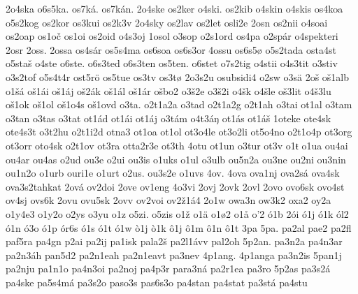 {    2o4ska
    o6s5ka.
    os7ká.
    os7kán.
    2o4ske
    os2ker
    o4ski.
    os2kib
    o4skin
    o4skis
    os4koa
    o5s2kog
    os2kor
    os3kui
    os2k3v
    2o4sky
    os2lav
    os2let
    osli2e
    2osn
    os2nii
    o4soai
    os2oap
    os1oč
    os1oi
    os2oid
    o4s3oj
    1osol
    o3sop
    o2s1ord
    os4pa
    o2spár
    o4spekteri
    2osr
    2oss.
    2ossa
    os4sár
    os5s4ma
    os6soa
    os6s3or
    4ossu
    os6s5ø
    o5s2tada
    osta4st
    o5staš
    o4ste
    o6ste.
    o6s3ted
    o6s3ten
    os5ten.
    o6stet
    o7s2tig
    o4stii
    o4s3tit
    o3stiv
    o3s2tof
    o5s4t4r
    ost5rö
    os5tue
    os3tv
    os3tø
    2o3s2u
    osubsidi4
    o2sw
    o3sä
    2oš
    oš1alb
    o1šá
    oš1ái
    oš1áj
    oš2ák
    oš1ál
    oš1ár
    ošbo2
    o3š2e
    o3š2i
    o4šk
    o4šle
    oš3lit
    o4š3lu
    oš1ok
    oš1ol
    oš1o4s
    oš1ovd
    o3ta.
    o2t1a2a
    o3tad
    o2t1a2g
    o2t1ah
    o3tai
    ot1al
    o3tam
    o3tan
    o3tas
    o3tat
    ot1ád
    ot1ái
    ot1áj
    o3tám
    o4t3áŋ
    ot1ás
    ot1áš
    1oteke
    ote4sk
    ote4s3t
    o3t2hu
    o2t1i2d
    otna3
    ot1oa
    ot1ol
    ot3o4le
    ot3o2li
    ot5o4no
    o2t1o4p
    ot3org
    ot3orr
    oto4sk
    o2t1ov
    ot3ra
    otta2r3e
    ot3th
    4otu
    ot1un
    o3tur
    ot3v
    o1ŧ
    o1ua
    ou4ai
    ou4ar
    ou4as
    o2ud
    ou3e
    o2ui
    ou3is
    o1uks
    o1ul
    o3ulb
    ou5n2a
    ou3ne
    ou2ni
    ou3nin
    ou1n2o
    o1urb
    ouri1e
    o1urt
    o2us.
    ou3s2e
    o1uvs
    4ov.
    4ova
    ova1nj
    ova2sá
    ova4sk
    ova3s2tahkat
    2ová
    ov2doi
    2ove
    ov1eng
    4o3vi
    2ovj
    2ovk
    2ovl
    2ovo
    ovo6sk
    ovo4st
    ov4sj
    ovs6k
    2ovu
    ovu5sk
    2ovv
    ov2voi
    ov2ž1á4
    2o1w
    owa3n
    ow3k2
    oxa2
    oy2a
    o1y4e3
    o1y2o
    o2ys
    o3yu
    o1z
    o5zi.
    o5zis
    o1ž
    o1ä
    o1ø2
    o1å
    o'2
    ó1b
    2ói
    ó1j
    ó1k
    ól2
    ó1n
    ó3o
    ó1p
    ór6s
    ó1s
    ó1t
    ó1w
    ò1j
    ò1k
    ô1j
    ô1m
    ô1n
    ô1t
    3pa
    5pa.
    pa2al
    pae2
    pa2fl
    paf5ra
    pa4gn
    p2ai
    pa2ij
    pa1isk
    pala2š
    pa2l1ávv
    pal2oh
    5p2an.
    pa3n2a
    pa4n3ar
    pa2n3áh
    pan5d2
    pa2n1eah
    pa2n1eavt
    pa3nev
    4p1ang.
    4p1anga
    pa3n2is
    5pan1j
    pa2nju
    pa1n1o
    pa4n3oi
    pa2noj
    pa4p3r
    para3ná
    pa2r1ea
    pa3ro
    5p2as
    pa3s2á
    pa4ske
    pa5s4má
    pa3s2o
    paso3s
    pas6s3o
    pa4stan
    pa4stat
    pa3stá
    pa4stu
}
